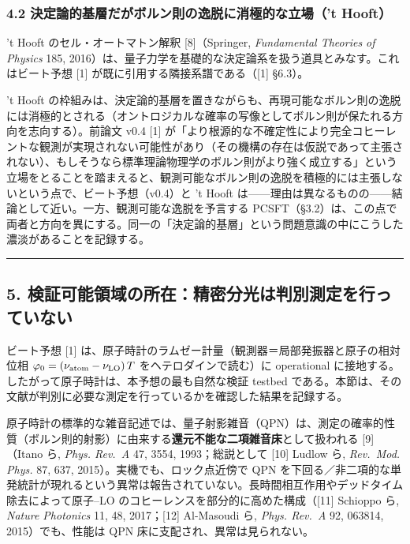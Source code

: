 \documentclass[
]{ltjsarticle}
\begin{document}
\subsubsection{4.2 決定論的基層だがボルン則の逸脱に消極的な立場（'t
Hooft）}\label{ux6c7aux5b9aux8ad6ux7684ux57faux5c64ux3060ux304cux30dcux30ebux30f3ux5247ux306eux9038ux8131ux306bux6d88ux6975ux7684ux306aux7acbux5834t-hooft}

't Hooft のセル・オートマトン解釈 {[}8{]}（Springer, \emph{Fundamental
Theories of Physics} 185,
2016）は、量子力学を基礎的な決定論系を扱う道具とみなす。これはビート予想
{[}1{]} が既に引用する隣接系譜である（{[}1{]} §6.3）。

't Hooft
の枠組みは、決定論的基層を置きながらも、再現可能なボルン則の逸脱には消極的とされる（オントロジカルな確率の写像としてボルン則が保たれる方向を志向する）。前論文
v0.4 {[}1{]}
が「より根源的な不確定性により完全コヒーレントな観測が実現されない可能性があり（その機構の存在は仮説であって主張されない）、もしそうなら標準理論物理学のボルン則がより強く成立する」という立場をとることを踏まえると、観測可能なボルン則の逸脱を積極的には主張しないという点で、ビート予想（v0.4）と
't Hooft
は------理由は異なるものの------結論として近い。一方、観測可能な逸脱を予言する
PCSFT（§3.2）は、この点で両者と方向を異にする。同一の「決定論的基層」という問題意識の中にこうした濃淡があることを記録する。

\begin{center}\rule{0.5\linewidth}{0.5pt}\end{center}

\subsection{5.
検証可能領域の所在：精密分光は判別測定を行っていない}\label{ux691cux8a3cux53efux80fdux9818ux57dfux306eux6240ux5728ux7cbeux5bc6ux5206ux5149ux306fux5224ux5225ux6e2cux5b9aux3092ux884cux3063ux3066ux3044ux306aux3044}

ビート予想 {[}1{]}
は、原子時計のラムゼー計量（観測器＝局部発振器と原子の相対位相
\(\varphi_0=(\nu_{\rm atom}-\nu_{\rm LO})\,T\) をヘテロダインで読む）に
operational に接地する。したがって原子時計は、本予想の最も自然な検証
testbed
である。本節は、その文献が判別に必要な測定を行っているかを確認した結果を記録する。

原子時計の標準的な雑音記述では、量子射影雑音（QPN）は、測定の確率的性質（ボルン則的射影）に由来する\textbf{還元不能な二項雑音床}として扱われる
{[}9{]}（Itano ら, \emph{Phys. Rev.~A} 47, 3554, 1993；総説として
{[}10{]} Ludlow ら, \emph{Rev.~Mod. Phys.} 87, 637,
2015）。実機でも、ロック点近傍で QPN
を下回る／非二項的な単発統計が現れるという異常は報告されていない。長時間相互作用やデッドタイム除去によって原子--LO
のコヒーレンスを部分的に高めた構成（{[}11{]} Schioppo ら, \emph{Nature
Photonics} 11, 48, 2017；{[}12{]} Al-Masoudi ら, \emph{Phys. Rev.~A} 92,
063814, 2015）でも、性能は QPN 床に支配され、異常は見られない。
\end{document}
